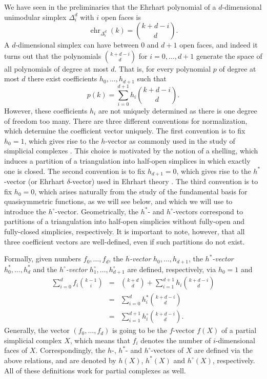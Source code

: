 \documentclass[12pt,reqno]{amsart}
\numberwithin{definition}{section}
\theoremstyle{definition}
\newcommand{\ehr}{\operatorname{ehr}}
\begin{document}
We have seen in the preliminaries that the Ehrhart polynomial of a $d$-dimensional unimodular simplex $\Delta^d_i$ with $i$ open faces is
\[
  \ehr_{\Delta^d_i}(k) = \binom{k+d-i}{d}.
\]
A $d$-dimensional simplex can have between 0 and $d+1$ open faces, and indeed it turns out that the polynomials $\binom{k+d-i}{d}$ for $i=0,\ldots,d+1$ generate the space of all polynomials of degree at most $d$. That is, for every polynomial $p$ of degree at most $d$ there exist coefficients $h_0,\ldots,h_{d+1}$ such that
\[
  p(k) = \sum_{i=0}^{d+1} h_i \binom{k+d-i}{d}.
\] 
However, these coefficients $h_i$ are not uniquely determined as there is one degree of freedom too many. There are three different conventions for normalization, which determine the coefficient vector uniquely. The first convention is to fix $h_0=1$, which gives rise to the $h$-vector as commonly used in the study of simplicial complexes \cite{something}. This choice is motivated by the notion of a shelling, which induces a partition of a triangulation into half-open simplices in which exactly one is closed. The second convention is to fix $h_{d+1}=0$, which gives rise to the $h^*$-vector (or Ehrhart $\delta$-vector) used in Ehrhart theory \cite{something}. The third convention is to fix $h_0=0$, which arises naturally from the study of the fundamental basis for quasisymmetric functions, as we will see below, and which we will use to introduce the $h^\circ$-vector. Geometrically, the $h^*$- and $h^\circ$-vectors correspond to partitions of a triangulation into half-open simplicies without fully-open and fully-closed simplicies, respectively. It is important to note, however, that all three coefficient vectors are well-defined, even if such partitions do not exist.

Formally, given numbers $f_0,\ldots,f_d$, the \emph{$h$-vector} $h_0,\ldots,h_{d+1}$, the \emph{$h^*$-vector} $h^*_0,\ldots,h^*_{d}$ and the \emph{$h^\circ$-vector} $h^\circ_1,\ldots,h^\circ_{d+1}$ are defined, respectively, via $h_0=1$ and
\begin{eqnarray*}
  \sum_{i=0}^{d} f_i \binom{k-1}{i} & = &
  \binom{k+d}{d} + \sum_{i=1}^{d+1} h_i \binom{k+d-i}{d} 
  \\ 
  & = & \sum_{i=0}^{d} h^*_i \binom{k+d-i}{d} \\
    & = & \sum_{i=1}^{d+1} h^\circ_i \binom{k+d-i}{d}.
\end{eqnarray*}
Generally, the vector $(f_0,\ldots,f_d)$ is going to be the $f$-vector $f(X)$ of a partial simplicial complex $X$, which means that $f_i$ denotes the number of $i$-dimensional faces of $X$. Correspondingly, the $h$-, $h^*$- and $h^\circ$-vectors of $X$ are defined via the above relations, and are denoted by $h(X)$, $h^*(X)$ and $h^\circ(X)$, respectively. All of these definitions work for partial complexes as well.
\end{document}
